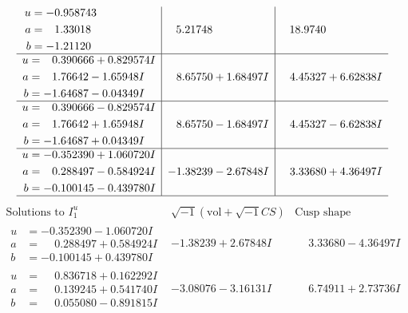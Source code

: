 \documentclass[1p]{elsarticle_modified}
\theoremstyle{definition}
\newcommand{\I}{\sqrt{-1}}
\begin{document}
$$\begin{array}{c|c|c}
\begin{aligned}
u &= -0.958743\phantom{ +0.000000I} \\
a &= \phantom{-}1.33018\phantom{ +0.000000I} \\
b &= -1.21120\phantom{ +0.000000I}\end{aligned}
 & \phantom{-}5.21748\phantom{ +0.000000I} & \phantom{-}18.9740\phantom{ +0.000000I} \\ \hline\begin{aligned}
u &= \phantom{-}0.390666 + 0.829574 I \\
a &= \phantom{-}1.76642 - 1.65948 I \\
b &= -1.64687 - 0.04349 I\end{aligned}
 & \phantom{-}8.65750 + 1.68497 I & \phantom{-}4.45327 + 6.62838 I \\ \hline\begin{aligned}
u &= \phantom{-}0.390666 - 0.829574 I \\
a &= \phantom{-}1.76642 + 1.65948 I \\
b &= -1.64687 + 0.04349 I\end{aligned}
 & \phantom{-}8.65750 - 1.68497 I & \phantom{-}4.45327 - 6.62838 I \\ \hline\begin{aligned}
u &= -0.352390 + 1.060720 I \\
a &= \phantom{-}0.288497 - 0.584924 I \\
b &= -0.100145 - 0.439780 I\end{aligned}
 & -1.38239 - 2.67848 I & \phantom{-}3.33680 + 4.36497 I\\
 \hline 
 \end{array}$$\newpage$$\begin{array}{c|c|c}  
\text{Solutions to }I^u_{1}& \I (\text{vol} + \sqrt{-1}CS) & \text{Cusp shape}\\
 \hline 
\begin{aligned}
u &= -0.352390 - 1.060720 I \\
a &= \phantom{-}0.288497 + 0.584924 I \\
b &= -0.100145 + 0.439780 I\end{aligned}
 & -1.38239 + 2.67848 I & \phantom{-}3.33680 - 4.36497 I \\ \hline\begin{aligned}
u &= \phantom{-}0.836718 + 0.162292 I \\
a &= \phantom{-}0.139245 + 0.541740 I \\
b &= \phantom{-}0.055080 - 0.891815 I\end{aligned}
 & -3.08076 - 3.16131 I & \phantom{-}6.74911 + 2.73736 I \\ \hline\begin{aligned}

\end{aligned}
\end{array}$$
\end{document}
